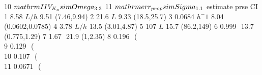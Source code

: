 \begin{Schunk}
\begin{Soutput}
10                                                                    $\\mathrm{IIV_{K_{a}}\\sim \\Omega_{3.3}}$
11                                                                     $\\mathrm{err_{prop}\\sim \\Sigma_{1.1}}$
                   estimate prse              CI
1              8.58 $ L/h $ 9.51     (7.46,9.94)
2                21.6 $ L $ 9.33     (18.5,25.7)
3          0.0684 $ h^-1  $ 8.04 (0.0602,0.0785)
4              3.78 $ L/h $ 13.5     (3.01,4.87)
5                 107 $ L $ 15.7      (86.2,149)
6                0.999 $  $ 13.7    (0.775,1.29)
7                 1.67 $  $ 21.9        (1,2.35)
8   0.196 $  $ (\\%CV=46.5) 23.1   (0.115,0.255)
9   0.129 $  $ (\\%CV=37.1) 30.4  (0.0641,0.184)
10  0.107 $  $ (\\%CV=33.6) 25.2  (0.0651,0.147)
11 0.0671 $  $ (\\%CV=26.3) 11.4 (0.0548,0.0803)
\end{Soutput}
\end{Schunk}
%
